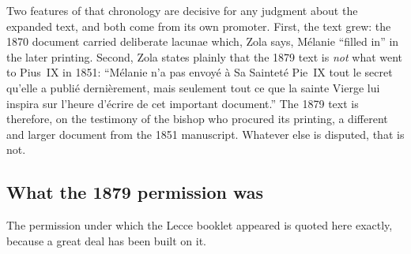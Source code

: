Two features of that chronology are decisive for any judgment about
the expanded text, and both come from its own promoter. First, the
text grew: the 1870 document carried deliberate lacunae which, Zola
says, Mélanie ``filled in'' in the later printing. Second, Zola
states plainly that the 1879 text is \emph{not} what went to Pius~IX
in 1851: ``Mélanie n'a pas envoyé à Sa Sainteté Pie~IX tout le
secret qu'elle a publié dernièrement, mais seulement tout ce que la
sainte Vierge lui inspira sur l'heure d'écrire de cet important
document.'' The 1879 text is
therefore, on the testimony of the bishop who procured its printing,
a different and larger document from the 1851 manuscript. Whatever
else is disputed, that is not.

\subsection{What the 1879 permission was}

The permission under which the Lecce booklet appeared is quoted
here exactly, because a great deal has been built on it.

